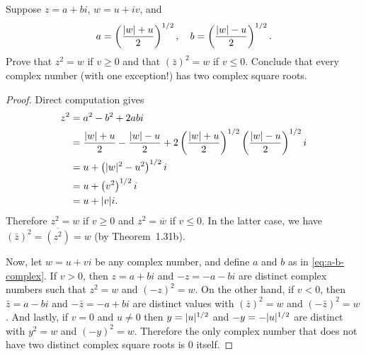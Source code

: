  Suppose $z = a + bi$, $w = u + iv$, and
\begin{equation}
  \label{eq:a-b-complex}
  a = \left(\frac{\lvert{w}\rvert + u}2\right)^{1/2}, \quad
  b = \left(\frac{\lvert{w}\rvert - u}2\right)^{1/2}.
\end{equation}
Prove that $z^2 = w$ if $v\geq0$ and that $(\bar z)^2 = w$ if
$v\leq0$. Conclude that every complex number (with one exception!) has
two complex square roots.
\begin{proof}
  Direct computation gives
  \begin{align*}
    z^2 &= a^2 - b^2 + 2abi \\
        &= \frac{\lvert{w}\rvert + u}2 - \frac{\lvert{w}\rvert - u}2
          + 2\left(\frac{\lvert{w}\rvert + u}2\right)^{1/2}
          \left(\frac{\lvert{w}\rvert - u}2\right)^{1/2}i \\
        &= u + \left(\lvert{w}\rvert^2 - u^2\right)^{1/2}i \\
        &= u + \left(v^2\right)^{1/2}i \\
        &= u + \lvert{v}\rvert i.
  \end{align*}
  Therefore $z^2 = w$ if $v\geq0$ and $z^2 = \overline{w}$ if
  $v\leq0$. In the latter case, we have
  $(\bar z)^2 = \overline{(z^2)} = w$ (by Theorem~1.31b).

  Now, let $w = u + vi$ be any complex number, and define $a$ and $b$
  as in \eqref{eq:a-b-complex}. If $v > 0$, then $z = a + bi$ and
  $-z = -a - bi$ are distinct complex numbers such that $z^2 = w$ and
  $(-z)^2 = w$. On the other hand, if $v < 0$, then $\bar{z} = a - bi$
  and $-\bar{z} = -a + bi$ are distinct values with $(\bar{z})^2 = w$
  and $(-\bar{z})^2 = w$. And lastly, if $v = 0$ and $u\neq0$ then
  $y = \lvert{u}\rvert^{1/2}$ and $-y = -\lvert{u}\rvert^{1/2}$ are distinct with
  $y^2 = w$ and $(-y)^2 = w$. Therefore the only complex number that
  does not have two distinct complex square roots is $0$ itself.
\end{proof}

